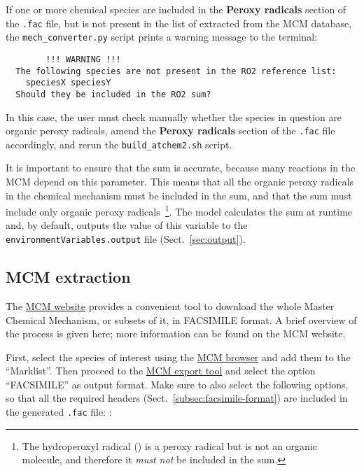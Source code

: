 If one or more chemical species are included in the \textbf{Peroxy radicals}
section of the \texttt{.fac} file, but is not present in the
list of  extracted from the MCM database, the
\texttt{mech\_converter.py} script prints a warning message to the
terminal:

\begin{verbatim}
        !!! WARNING !!!
  The following species are not present in the RO2 reference list:
    speciesX speciesY
  Should they be included in the RO2 sum?
\end{verbatim}

In this case, the user must check manually whether the species in
question are organic peroxy radicals, amend the \textbf{Peroxy radicals}
section of the \texttt{.fac} file accordingly, and rerun the
\texttt{build\_atchem2.sh} script.

It is important to ensure that the  sum is accurate, because
many reactions in the MCM depend on this parameter. This means that
all the organic peroxy radicals in the chemical mechanism must be
included in the  sum, and that the  sum must include
only organic peroxy radicals~\footnote{The hydroperoxyl radical
  () is a peroxy radical but is not an organic molecule, and
  therefore it \emph{must not} be included in the  sum.}. The
model calculates the  sum at runtime and, by default, outputs
the value of this variable to the \texttt{environmentVariables.output}
file (Sect.~\ref{sec:output}).

\subsection{MCM extraction} \label{subsec:mcm-extraction}

The \href{https://mcm.york.ac.uk/MCM/}{MCM website} provides a
convenient tool to download the whole Master Chemical Mechanism, or
subsets of it, in FACSIMILE format. A brief overview of the process is
given here; more information can be found on the MCM website.

First, select the species of interest using the
\href{https://mcm.york.ac.uk/MCM/browse}{MCM browser} and add them to
the ``Marklist''. Then proceed to the
\href{https://mcm.york.ac.uk/MCM/export}{MCM export tool} and select
the option ``FACSIMILE'' as output format. Make sure to also select
the following options, so that all the required headers
(Sect.~\ref{subsec:facsimile-format}) are included in the generated
\texttt{.fac} file: :

